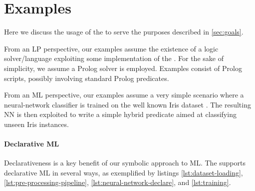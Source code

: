 \documentclass[runningheads]{llncs}
\begin{document}
\section{\mllib{} Examples}
\label{sec:examples}

Here we discuss the usage of the \mllib{} to serve the purposes described in \cref{sec:goals}.

From an LP perspective, our examples assume the existence of a logic solver/language exploiting some implementation of the \mllib{}.
%
For the sake of simplicity, we assume a Prolog solver is employed.
%
Examples consist of Prolog scripts, possibly involving standard Prolog predicates.

From an ML perspective, our examples assume a very simple scenario where a neural-network classifier is trained on the well known Iris dataset \cite{iris-dataset}.
%
The resulting NN is then exploited to write a simple hybrid predicate aimed at classifying unseen Iris instances.

\paragraph{Declarative ML}
%
Declarativeness is a key benefit of our symbolic approach to ML.
%
The \mllib{} supports declarative ML in several ways, as exemplified by listings \ref{lst:dataset-loading}, \ref{lst:pre-processing-pipeline}, \ref{lst:neural-network-declare}, and \ref{lst:training}.

\end{document}
